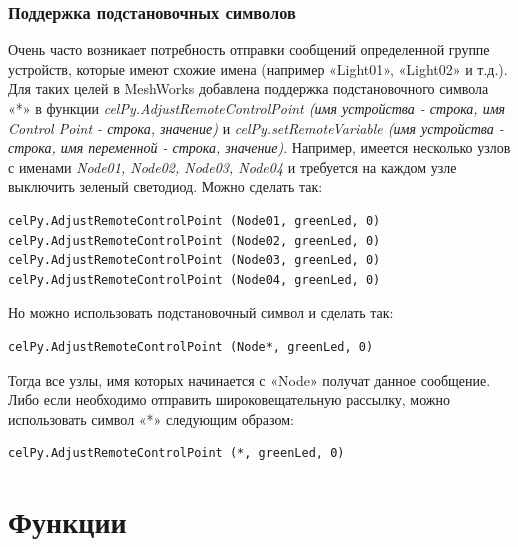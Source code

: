 \documentclass[12pt]{article}
\begin{document}
\subsubsection{Поддержка подстановочных символов}
Очень часто возникает потребность отправки сообщений определенной группе устройств, 
которые имеют схожие имена (например «Light01», «Light02» и т.д.). Для таких 
целей в MeshWorks добавлена поддержка подстановочного символа «*» в функции 
\emph{celPy.AdjustRemoteControlPoint (имя устройства - строка, имя Control Point 
- строка, значение)} и \emph{celPy.setRemoteVariable (имя устройства - строка, 
имя переменной - строка, значение)}.
Например, имеется несколько узлов с именами \emph{Node01, Node02, Node03, Node04} 
и требуется на каждом узле выключить зеленый светодиод. Можно сделать так:
\begin{verbatim}
celPy.AdjustRemoteControlPoint (Node01, greenLed, 0)
celPy.AdjustRemoteControlPoint (Node02, greenLed, 0)
celPy.AdjustRemoteControlPoint (Node03, greenLed, 0)
celPy.AdjustRemoteControlPoint (Node04, greenLed, 0)
\end{verbatim}
Но можно использовать подстановочный символ и сделать так:
\begin{verbatim}
celPy.AdjustRemoteControlPoint (Node*, greenLed, 0)
\end{verbatim}
Тогда все узлы, имя которых начинается с «Node» получат данное сообщение. 
Либо если необходимо отправить широковещательную рассылку, можно использовать 
символ «*» следующим образом:
\begin{verbatim}
celPy.AdjustRemoteControlPoint (*, greenLed, 0)
\end{verbatim}
\section{Функции}
\end{document}
